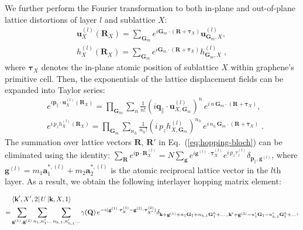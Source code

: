 \documentclass[aps,prx,10pt,twocolumn,superscriptaddress]{revtex4}
\def\Red#1{\textcolor{red}{#1}}
\begin{document}
We further perform the Fourier transformation to both  in-plane and out-of-plane lattice distortions of layer $l$ and sublattice $X$:
\begin{equation}
\begin{split}
\textbf{u}^{(l)}_{X}(\textbf{R}_X)=\sum_{\textbf{G}_{m}}e^{i\textbf{G}_{m}\cdot(\textbf{R}+\bm{\tau}_{X})}\textbf{u}^{(l)}_{\textbf{G}_{m},X},\\
h^{(l)}_{X}(\textbf{R}_X)=\sum_{\textbf{G}_{m}}e^{i\textbf{G}_{m}\cdot(\textbf{R}+\bm{\tau}_{X})}h^{(l)}_{\textbf{G}_{m},X}\;,
\end{split}
\end{equation}
where $\bm{\tau}_{X}$ denotes the in-plane atomic position of sublattice $X$ within graphene's primitive cell.
Then, the exponentials of the lattice displacement fields can be expanded into Taylor series:
\begin{equation}
\begin{split}
&e^{i\textbf{p}_{\parallel}\cdot\textbf{u}^{(l)}_{X}(\textbf{R}_X)}
=\prod_{\textbf{G}_{m}}\sum_{n}\frac{1}{n!}(i\textbf{q}_{\parallel}\cdot\textbf{u}^{(l)}_{X,\textbf{G}_{m}})^{n}\,e^{i\,n\,\textbf{G}_{m}\cdot(\textbf{R}+\bm{\tau}_{X})},\\
&e^{i\,p_{z}h^{(l)}_{X}(\textbf{R}_X)}
=\prod_{\textbf{G}_{m}}\sum_{n_{h}}\frac{1}{n_{h}!}(i\,p_{z}h^{(l)}_{X,\mathbf{G}_m})^{n_{h}}\,e^{i\,n_{h}\,\mathbf{G}_m\cdot(\textbf{R}+\bm{\tau}_{X})}\;.
\end{split}
\label{eq:uh-taylor}
\end{equation}
The summation over lattice vectors $\mathbf{R}$, $\mathbf{R}'$ in Eq.~(\ref{eq:hopping-bloch}) can be eliminated using the identity: $\sum_{\textbf{R}}e^{i\textbf{p}\cdot\textbf{R}^{(l)}_X}\!=\!N\sum_{\textbf{g}}e^{i\textbf{g}^{(l)}\cdot\bm{\tau}^{(l)}_{X}}e^{i\,p_{z}\tau^{(l)}_{z}}\delta_{\textbf{p}_{\parallel},\textbf{g}^{(l)}}$, where $\textbf{g}^{(l)}\!=\!m_{1}\textbf{a}^{*,(l)}_{1}+m_{2}\textbf{a}^{*,(l)}_{2}$ is the atomic reciprocal lattice vector in the $l$th layer. As a result, we obtain the following interlayer hopping matrix element:
\begin{widetext}
\begin{equation}
\begin{split}
&\bra{\textbf{k}',X',2}U\ket{\textbf{k},X,1}\\
=&\sum_{\textbf{g}^{(1)},\textbf{g}^{(2)}}\sum_{n_{1},n_1' \dots}\sum_{n_{h,1},n_{h,1}' \dots}\gamma(\textbf{Q})\,e^{-i(\textbf{g}^{(1)}\cdot\bm{\tau}^{(1)}_{X}-\textbf{g}^{(2)}\cdot\bm{\tau}^{(2)}_{X'})}\delta_{\textbf{k}+\textbf{g}^{(1)}+n_{1}\textbf{G}_{1}+n_{h,1}\textbf{G}^{h}_{1}+\dots\, \mathbf{,}\,\textbf{k}'+\textbf{g}^{(2)}-n'_{1}\textbf{G}_{1}-n'_{h,1}\textbf{G}^{h}_{1}+\dots},
\end{split}
\label{eq:hopping-bloch2}
\end{equation}
\end{widetext}
\end{document}
